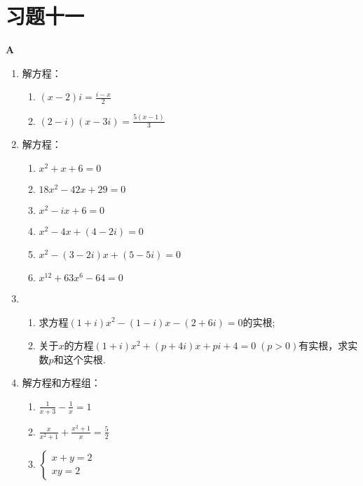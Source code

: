 \section*{习题十一}
\begin{center}
    \bfseries A
\end{center}

\begin{enumerate}
    \item 解方程：
\begin{multicols}{2}
\begin{enumerate}[(1)]
    \item $(x-2)i=\frac{i-x}{2}$
    \item $(2-i)(x-3i)=\frac{5(x-1)}{3}$
\end{enumerate}
\end{multicols}
    \item 解方程：
\begin{multicols}{2}
\begin{enumerate}[(1)]
    \item $x^2+x+6=0$
    \item $18x^2-42x+29=0$
    \item $x^2-ix+6=0$
    \item $x^2-4x+(4-2i)=0$
    \item $x^2-(3-2i)x+(5-5i)=0$
    \item $x^{12}+63x^6-64=0$
\end{enumerate}
\end{multicols}
\item \begin{enumerate}[(1)]
    \item 求方程$(1+i)x^2-(1-i)x-(2+6i)=0$的实根;
    \item 关于$x$的方程$(1+i)x^2+(p+4i)x+pi+4=0\; (p>0)$有实根，求实数$p$和这个实根.
\end{enumerate}
\item 解方程和方程组：
\begin{multicols}{2}
\begin{enumerate}[(1)]
    \item $\frac{1}{x+3}-\frac{1}{x}=1$
    \item $\frac{x}{x^2+1}+\frac{x^2+1}{x}=\frac{5}{2}$
    \item $\begin{cases}
        x+y=2\\ xy=2
    \end{cases}$
\end{enumerate}
\end{multicols}


\end{enumerate}
